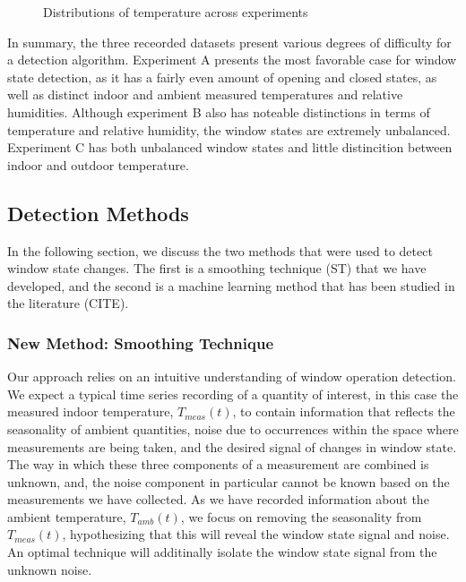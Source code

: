 \documentclass[sigconf]{acmart}
\begin{document}
\begin{figure}
\begin{minipage}[t]{0.33\linewidth}
{{}

}

\subcaption{\label{fig-dexpc}}
\end{minipage}%

\caption{\label{fig-data-collected}Distributions of temperature across
experiments}

\end{figure}

In summary, the three receorded datasets present various degrees of
difficulty for a detection algorithm. Experiment A presents the most
favorable case for window state detection, as it has a fairly even
amount of opening and closed states, as well as distinct indoor and
ambient measured temperatures and relative humidities. Although
experiment B also has noteable distinctions in terms of temperature and
relative humidity, the window states are extremely unbalanced.
Experiment C has both unbalanced window states and little distincition
between indoor and outdoor temperature.

\hypertarget{detection-methods}{%
\subsection{Detection Methods}\label{detection-methods}}

In the following section, we discuss the two methods that were used to
detect window state changes. The first is a smoothing technique (ST)
that we have developed, and the second is a machine learning method that
has been studied in the literature (CITE).

\hypertarget{new-method-smoothing-technique}{%
\subsubsection{New Method: Smoothing
Technique}\label{new-method-smoothing-technique}}

Our approach relies on an intuitive understanding of window operation
detection. We expect a typical time series recording of a quantity of
interest, in this case the measured indoor temperature, \(T_{meas}(t)\),
to contain information that reflects the seasonality of ambient
quantities, noise due to occurrences within the space where measurements
are being taken, and the desired signal of changes in window state. The
way in which these three components of a measurement are combined is
unknown, and, the noise component in particular cannot be known based on
the measurements we have collected. As we have recorded information
about the ambient temperature, \(T_{amb}(t)\), we focus on removing the
seasonality from \(T_{meas}(t)\), hypothesizing that this will reveal
the window state signal and noise. An optimal technique will additinally
isolate the window state signal from the unknown noise.
\end{document}
